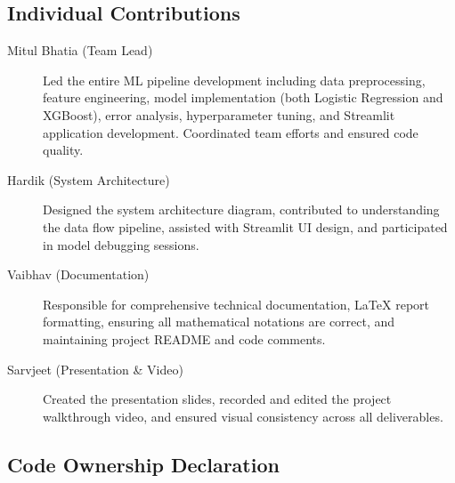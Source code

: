 \documentclass[12pt,a4paper]{article}
\begin{document}
\subsection{Individual Contributions}

\begin{description}
    \item[Mitul Bhatia (Team Lead)] Led the entire ML pipeline development including data preprocessing, feature engineering, model implementation (both Logistic Regression and XGBoost), error analysis, hyperparameter tuning, and Streamlit application development. Coordinated team efforts and ensured code quality.
    
    \item[Hardik (System Architecture)] Designed the system architecture diagram, contributed to understanding the data flow pipeline, assisted with Streamlit UI design, and participated in model debugging sessions.
    
    \item[Vaibhav (Documentation)] Responsible for comprehensive technical documentation, LaTeX report formatting, ensuring all mathematical notations are correct, and maintaining project README and code comments.
    
    \item[Sarvjeet (Presentation \& Video)] Created the presentation slides, recorded and edited the project walkthrough video, and ensured visual consistency across all deliverables.
\end{description}

\subsection{Code Ownership Declaration}

\begin{center}
\end{center}
\end{document}
